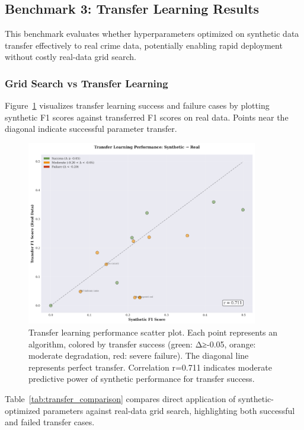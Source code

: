 \begin{table}[H]
\begin{table}[H]
\begin{table}[H]
\begin{table}[H]
\subsection{Benchmark 3: Transfer Learning Results}
\label{sec:results_transfer}

This benchmark evaluates whether hyperparameters optimized on synthetic data transfer effectively to real crime data, potentially enabling rapid deployment without costly real-data grid search.

\subsubsection{Grid Search vs Transfer Learning}

Figure~\ref{fig:transfer_scatter} visualizes transfer learning success and failure cases by plotting synthetic F1 scores against transferred F1 scores on real data. Points near the diagonal indicate successful parameter transfer.

\begin{figure}[htbp]
\centering
\includegraphics[width=0.9\textwidth]{figures/fig_transfer_learning_scatter.png}
\caption{Transfer learning performance scatter plot. Each point represents an algorithm, colored by transfer success (green: Δ≥-0.05, orange: moderate degradation, red: severe failure). The diagonal line represents perfect transfer. Correlation r=0.711 indicates moderate predictive power of synthetic performance for transfer success.}
\label{fig:transfer_scatter}
\end{figure}

Table~\ref{tab:transfer_comparison} compares direct application of synthetic-optimized parameters against real-data grid search, highlighting both successful and failed transfer cases.


\end{table}
\end{table}
\end{table}
\end{table}
